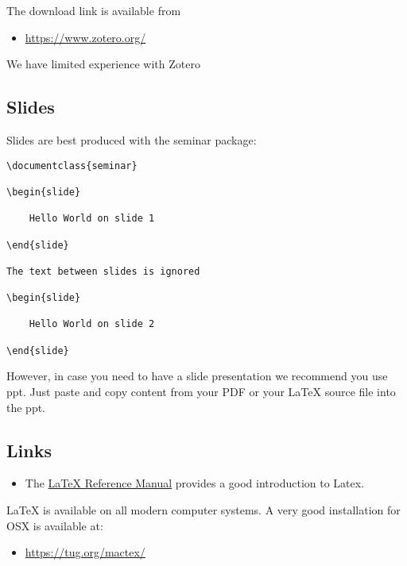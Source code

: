 The download link is available from

\begin{itemize}
\tightlist
\item
  \url{https://www.zotero.org/}
\end{itemize}

We have limited experience with Zotero

\subsection{Slides}\label{slides}

Slides are best produced with the seminar package:

\begin{verbatim}
\documentclass{seminar}

\begin{slide}

    Hello World on slide 1

\end{slide}

The text between slides is ignored

\begin{slide}

    Hello World on slide 2

\end{slide}
\end{verbatim}

However, in case you need to have a slide presentation we recommend you
use ppt. Just paste and copy content from your PDF or your LaTeX source
file into the ppt.

\subsection{Links}\label{links}

\begin{itemize}
\tightlist
\item
  The
  \href{http://texdoc.net/texmf-dist/doc/latex/latex2e-help-texinfo/latex2e.pdf}{LaTeX
  Reference Manual} provides a good introduction to Latex.
\end{itemize}

LaTeX is available on all modern computer systems. A very good
installation for OSX is available at:

\begin{itemize}
\tightlist
\item
  \url{https://tug.org/mactex/}
\end{itemize}

